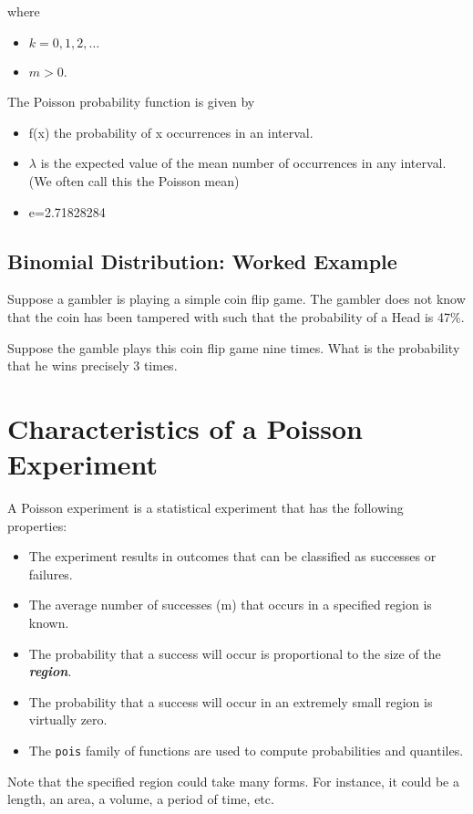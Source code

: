 \documentclass[]{article}
\begin{document}
where
\begin{itemize}
	\item $k = 0, 1, 2, \ldots$
	\item $m > 0$.
\end{itemize}

The Poisson probability function is given by



\begin{itemize} 
	\item	f(x) the probability of x occurrences in an interval. 
	\item	$\lambda$ is the expected value of the mean number of occurrences in any interval. (We often call this the Poisson mean)
	\item	e=2.71828284
\end{itemize} 



\subsection{Binomial Distribution: Worked Example}
Suppose a gambler is playing a simple coin flip game. 
The gambler does not know that the coin has been tampered with such that the probability of a Head is 47\%.

Suppose the gamble plays this coin flip game nine times. 
What is the probability that he wins precisely 3 times.

	\section{Characteristics of a Poisson Experiment}
	A Poisson experiment is a statistical experiment that has the following properties:
	\begin{itemize}
		\item The experiment results in outcomes that can be classified as successes or failures.
		\item The average number of successes (m) that occurs in a specified region is known.
		\item The probability that a success will occur is proportional to the size of the \textbf{\emph{region}}.
		\item The probability that a success will occur in an extremely small region is virtually zero.
		\item The \texttt{pois} family of functions are used to compute probabilities and quantiles.
	\end{itemize}
	Note that the specified region could take many forms. For instance, it could be a length, an area, a volume, a period of time, etc.
	
\end{document}
